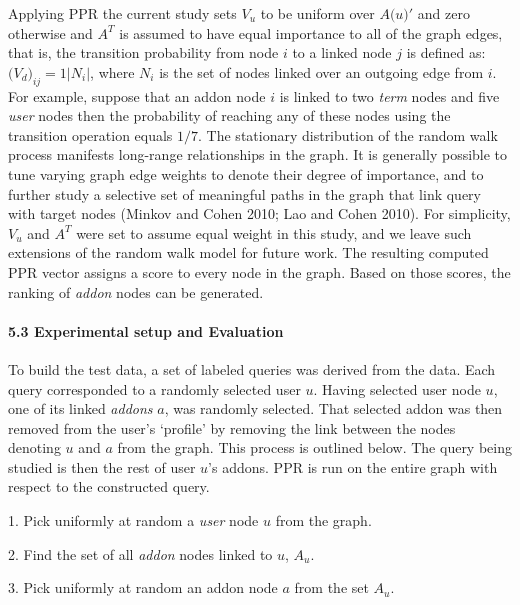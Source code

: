\documentclass{article} %
\begin{document}
Applying PPR the current study sets $V_u$ to be uniform over $A\mathrm{(}u\mathrm{)'}$ and zero otherwise and $A^T$ is assumed to have equal importance to all of the graph edges, that is, the transition probability from node $i$ to a linked node $j$ is defined as: $\mathrm{(}V_d{\mathrm{)}}_{ij}\mathrm{=1|}N_i\mathrm{|}$, where $N_i$ is the set of nodes linked over an outgoing edge from $i$. For example, suppose that an addon node $i$ is linked to two \textit{term} nodes and five \textit{user} nodes then the probability of reaching any of these nodes using the transition operation equals $\mathrm{1/7}$. The stationary distribution of the random walk process manifests long-range relationships in the graph. It is generally possible to tune varying graph edge weights to denote their degree of importance, and to further study a selective set of meaningful paths in the graph that link query with target nodes (Minkov and Cohen 2010; Lao and Cohen 2010). For simplicity, $V_u$ and $A^T$ were set to assume equal weight in this study, and we leave such extensions of the random walk model for future work. The resulting computed PPR vector assigns a score to every node in the graph. Based on those scores, the ranking of\textit{ addon} nodes can be generated.   

\noindent 




\paragraph{5.3  Experimental setup and Evaluation }



To build the test data, a set of labeled queries was derived from the data. Each query corresponded to a randomly selected user $u$. Having selected user node $u$, one of its linked \textit{addons} $a$, was randomly selected. That selected addon was then removed from the user's `profile' by removing the link between the nodes denoting $u$ and $a$ from the graph. This process is outlined below. The query being studied is then the rest of user $u$'s addons. PPR is run on the entire graph with respect to the constructed query.

1.  Pick uniformly at random a \textit{user} node $u$ from the graph. 

2.  Find the set of all \textit{addon} nodes linked to $u$, $A_u$. 

3.  Pick uniformly at random an addon node $a$ from the set $A_u$. 
\end{document}
